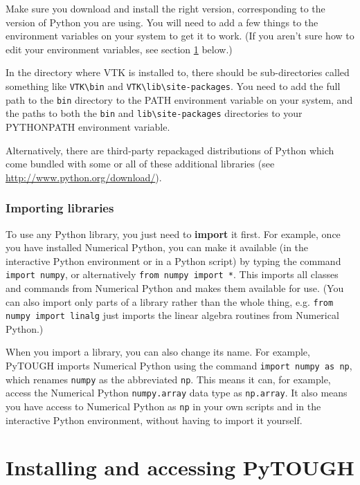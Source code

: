 Make sure you download and install the right version, corresponding to the version of Python you are using.  You will need to add a few things to the environment variables on your system to get it to work.  (If you aren't sure how to edit your environment variables, see section \ref{installing} below.) 

In the directory where VTK is installed to, there should be sub-directories called something like \texttt{VTK\textbackslash bin} and \texttt{VTK\textbackslash lib\textbackslash site-packages}.  You need to add the full path to the \texttt{bin} directory to the PATH environment variable on your system, and the paths to both the \texttt{bin} and \texttt{lib\textbackslash site-packages} directories to your PYTHONPATH environment variable.

Alternatively, there are third-party repackaged distributions of Python which come bundled with some or all of these additional libraries (see \url{http://www.python.org/download/}).

\subsubsection{Importing libraries}

To use any Python library, you just need to \textbf{import} it first.  For example, once you have installed Numerical Python, you can make it available (in the interactive Python environment or in a Python script) by typing the command \texttt{import numpy}, or alternatively \texttt{from numpy import *}.  This imports all classes and commands from Numerical Python and makes them available for use.  (You can also import only parts of a library rather than the whole thing, e.g. \texttt{from numpy import linalg} just imports the linear algebra routines from Numerical Python.)

When you import a library, you can also change its name.  For example, PyTOUGH imports Numerical Python using the command \texttt{import numpy as np}, which renames \texttt{numpy} as the abbreviated \texttt{np}.  This means it can, for example, access the Numerical Python \texttt{numpy.array} data type as \texttt{np.array}.  It also means you have access to Numerical Python as \texttt{np} in your own scripts and in the interactive Python environment, without having to import it yourself.

\section{Installing and accessing PyTOUGH}
\label{installing}

